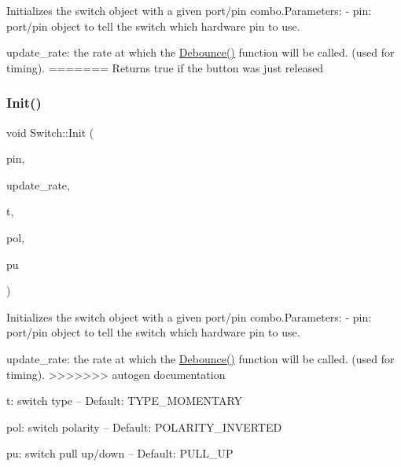 Initializes the switch object with a given port/pin combo.\+Parameters\+: -\/ pin\+: port/pin object to tell the switch which hardware pin to use.
\begin{DoxyItemize}
\item update\+\_\+rate\+: the rate at which the \hyperlink{classdaisy_1_1_switch_a564849b2de31395dda3cb464a65c5a24}{Debounce()} function will be called. (used for timing).
=======
Returns true if the button was just released \mbox{\label{classdaisy_1_1_switch_adac599b1203f5eb0d6153110d851b4b4}} 
\subsubsection{\texorpdfstring{Init()}{Init()}}
{\footnotesize\ttfamily void Switch\+::\+Init (\begin{DoxyParamCaption}\item[{\hyperlink{structdsy__gpio__pin}{dsy\+\_\+gpio\+\_\+pin}}]{pin,  }\item[{float}]{update\+\_\+rate,  }\item[{\hyperlink{classdaisy_1_1_switch_a944058682bae079439ddddd42302b483}{Type}}]{t,  }\item[{\hyperlink{classdaisy_1_1_switch_aef37136dd1b4cd077ef82a0f62bcfa3d}{Polarity}}]{pol,  }\item[{\hyperlink{classdaisy_1_1_switch_aa6c26cb923638a248a1d8d3cb1755e51}{Pull}}]{pu }\end{DoxyParamCaption})}

Initializes the switch object with a given port/pin combo.\+Parameters\+: -\/ pin\+: port/pin object to tell the switch which hardware pin to use.
\begin{DoxyItemize}
\item update\+\_\+rate\+: the rate at which the \hyperlink{classdaisy_1_1_switch_aa099b4d8f0d7073dd6d5c2f6e9d81d9c}{Debounce()} function will be called. (used for timing).
>>>>>>> autogen documentation
\item t\+: switch type -- Default\+: T\+Y\+P\+E\+\_\+\+M\+O\+M\+E\+N\+T\+A\+RY
\item pol\+: switch polarity -- Default\+: P\+O\+L\+A\+R\+I\+T\+Y\+\_\+\+I\+N\+V\+E\+R\+T\+ED
\item pu\+: switch pull up/down -- Default\+: P\+U\+L\+L\+\_\+\+UP 
\end{DoxyItemize}\mbox{\label{classdaisy_1_1_switch_abe39a637bc58c3f5cbbaf5ffaaece7a9}} 

\end{DoxyItemize}
